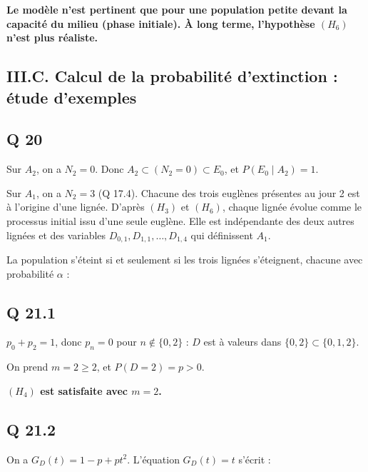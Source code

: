 \documentclass[11pt,a4paper]{article}
\newcommand{\equationajustee}[1]{%
  \sbox{\boiteequation}{$\displaystyle #1$}%
  \ifdim\wd\boiteequation>\linewidth
    \[\resizebox{\linewidth}{!}{\usebox{\boiteequation}}\]%
  \else
    \[#1\]%
  \fi}
\begin{document}
\textbf{Le modèle n'est pertinent que pour une population petite devant la capacité du milieu (phase initiale). À long terme, l'hypothèse \((H_6)\) n'est plus réaliste.}

\hypertarget{iii.c.-calcul-de-la-probabilituxe9-dextinction-uxe9tude-dexemples}{%
\subsection{III.C. Calcul de la probabilité d'extinction : étude d'exemples}\label{iii.c.-calcul-de-la-probabilituxe9-dextinction-uxe9tude-dexemples}}

\hypertarget{q-20}{%
\subsection{Q 20}\label{q-20}}

Sur \(A_2\), on a \(N_2=0\). Donc \(A_2\subset(N_2=0)\subset E_0\), et \(P(E_0\mid A_2)=1\).

Sur \(A_1\), on a \(N_2=3\) (Q 17.4). Chacune des trois euglènes présentes au jour 2 est à l'origine d'une lignée. D'après \((H_3)\) et \((H_6)\), chaque lignée évolue comme le processus initial issu d'une seule euglène. Elle est indépendante des deux autres lignées et des variables \(D_{0,1},D_{1,1},\dots,D_{1,4}\) qui définissent \(A_1\).

La population s'éteint si et seulement si les trois lignées s'éteignent, chacune avec probabilité \(\alpha\) :

\equationajustee{\boxed{P(E_0\mid A_1)=\alpha^3}}

\equationajustee{\boxed{P(E_0\mid A_2)=1}}

\hypertarget{q-21.1}{%
\subsection{Q 21.1}\label{q-21.1}}

\(p_0+p_2=1\), donc \(p_n=0\) pour \(n\notin\{0,2\}\) : \(D\) est à valeurs dans \(\{0,2\}\subset\{0,1,2\}\).

On prend \(m=2\ge2\), et \(P(D=2)=p>0\).

\textbf{\((H_4)\) est satisfaite avec \(m=2\).}

\hypertarget{q-21.2}{%
\subsection{Q 21.2}\label{q-21.2}}

On a \(G_D(t)=1-p+pt^2\). L'équation \(G_D(t)=t\) s'écrit :
\end{document}
